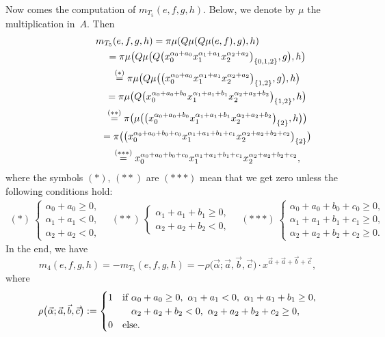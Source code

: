 \documentclass[10pt,a4paper]{amsart}
\numberwithin{equation}{section}
\renewcommand{\a}{\alpha}
\begin{document}
Now comes the computation of $m_{T_5}(e,f,g,h)$. Below, we denote by $\mu$ the multiplication in~$A$. Then
\begin{gather*}
m_{T_5}(e,f,g,h)= \pi\mu(Q\mu(Q\mu(e,f),g),h) \\
\hphantom{m_{T_5}(e,f,g,h)}{}= \pi\mu\big(Q\mu\big(Q\big(x_0^{\alpha_0+a_0}x_1^{\alpha_1+a_1}x_2^{\alpha_2+a_2}\big)_{\{0,1,2\}},g\big),h\big) \\
\hphantom{m_{T_5}(e,f,g,h)}{}\overset{(*)}{=}\pi\mu\big(Q\mu\big(\big(x_0^{\alpha_0+a_0}x_1^{\alpha_1+a_1}x_2^{\alpha_2+a_2}\big)_{\{1,2\}},g\big),h\big)   \\
\hphantom{m_{T_5}(e,f,g,h)}{}=\pi\mu\big(Q\big(x_0^{\alpha_0+a_0+b_0}x_1^{\alpha_1+a_1+b_1}x_2^{\alpha_2+a_2+b_2}\big)_{\{1,2\}},h\big) \\
\hphantom{m_{T_5}(e,f,g,h)}{}\overset{({*}{*})}{=}\pi\big(\mu\big(\big(x_0^{\alpha_0+a_0+b_0}x_1^{\alpha_1+a_1+b_1}x_2^{\alpha_2+a_2+b_2}\big)_{\{2\}},h\big)\big)   \\
\hphantom{m_{T_5}(e,f,g,h)}{}=\pi\big(\big(x_0^{\alpha_0+a_0+b_0+c_0}x_1^{\alpha_1+a_1+b_1+c_1}x_2^{\alpha_2+a_2+b_2+c_2}\big)_{\{2\}}\big) \\
\hphantom{m_{T_5}(e,f,g,h)}{}\overset{({*}{*}{*})}{=} x_0^{\alpha_0+a_0+b_0+c_0}x_1^{\alpha_1+a_1+b_1+c_1}x_2^{\alpha_2+a_2+b_2+c_2},
\end{gather*}
where the symbols $(*)$, $({*}{*})$ are $({*}{*}{*})$ mean that we get zero unless the following conditions hold:
\begin{gather*}
	(*)\ \begin{cases}
	\alpha_0+a_0\geq 0,\\
	\alpha_1+a_1<0,\\
	\alpha_2+a_2<0,
			\end{cases} \quad
	({*}{*})\ \begin{cases}
	\alpha_1+a_1+b_1\geq 0,\\
	\alpha_2+a_2+b_2<0,
			\end{cases}\quad
	({*}{*}{*})\ \begin{cases}
	\alpha_0+a_0+b_0+c_0\geq0,\\
	\alpha_1+a_1+b_1+c_1\geq0,\\
	\alpha_2+a_2+b_2+c_2\geq 0.
	\end{cases}
\end{gather*}
In the end, we have
\[
m_4(e,f,g,h)=-m_{T_5}(e,f,g,h)=
-\rho\big(\vec{\a};\vec{a},\vec{b},\vec{c}\big)\cdot x^{\vec{\a}+\vec{a}+\vec{b}+\vec{c}},
\]
where
\[
\rho\big(\vec{\a};\vec{a},\vec{b},\vec{c}\big):=\begin{cases}
  1 & \text{if} \ \alpha_0+a_0\geq 0,
    \ \alpha_1+a_1<0,
	\ \alpha_1+a_1+b_1\geq 0,\\
    &\hphantom{\text{if}}\ \alpha_2+a_2+b_2<0,
	\ \alpha_2+a_2+b_2+c_2\geq 0,\\
	0 & \text{else}.
\end{cases}\]
\end{document}
